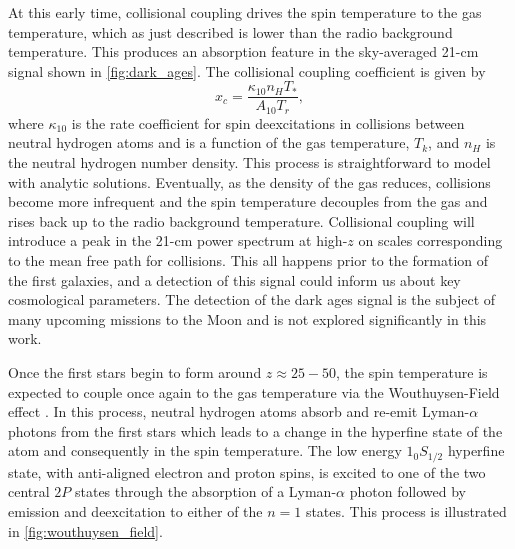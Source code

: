 At this early time, collisional coupling drives the spin temperature to the gas temperature, which as just described is lower than the radio background temperature. This produces an absorption feature in the sky-averaged 21-cm signal shown in \cref{fig:dark_ages}. The collisional coupling coefficient is given by
\begin{equation}
    x_c = \frac{\kappa_{10} n_H T_*}{A_{10} T_r},
\end{equation}
where $\kappa_{10}$ is the rate coefficient for spin deexcitations in collisions between neutral hydrogen atoms and is a function of the gas temperature, $T_k$, and $n_H$ is the neutral hydrogen number density. This process is straightforward to model with analytic solutions. Eventually, as the density of the gas reduces, collisions become more infrequent and the spin temperature decouples from the gas and rises back up to the radio background temperature. Collisional coupling will introduce a peak in the 21-cm power spectrum at high-$z$ on scales corresponding to the mean free path for collisions. This all happens prior to the formation of the first galaxies, and a detection of this signal could inform us about key cosmological parameters. The detection of the dark ages signal is the subject of many upcoming missions to the Moon \cite{Burns_Moon_2021} and is not explored significantly in this work.

Once the first stars begin to form around $z\approx25-50$, the spin temperature is expected to couple once again to the gas temperature via the Wouthuysen-Field effect \cite{Wouthuysen1952, Field1959}. In this process, neutral hydrogen atoms absorb and re-emit Lyman-$\alpha$ photons from the first stars which leads to a change in the hyperfine state of the atom and consequently in the spin temperature. The low energy $1_0 S_{1/2}$ hyperfine state, with anti-aligned electron and proton spins, is excited to one of the two central $2P$ states through the absorption of a Lyman-$\alpha$ photon followed by emission and deexcitation to either of the $n = 1$ states. This process is illustrated in \cref{fig:wouthuysen_field}.

